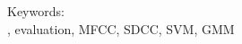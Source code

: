 
\vspace*{0.2cm}

\noindent Keywords: \\ 
\noindent \quran, evaluation, MFCC, SDCC, SVM, GMM \\

\newpage